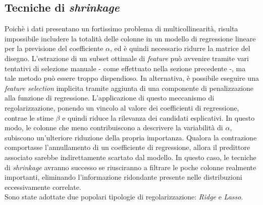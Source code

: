 \documentclass[fleqn,10pt]{SelfArx} %
\begin{document}
\subsection{Tecniche di \textit{shrinkage}}
Poichè i dati presentano un fortissimo problema di multicollinearità, risulta impossibile includere la totalità delle colonne in un modello di regressione lineare per la previsione del coefficiente $\alpha$, ed è quindi necessario ridurre la matrice del disegno. L'estrazione di un subset ottimale di \textit{feature} può avvenire tramite vari tentativi di selezione manuale - come effettuato nella sezione precedente -, ma tale metodo può essere troppo dispendioso. In alternativa, è possibile eseguire una \textit{feature selection} implicita tramite aggiunta di una componente di penalizzazione alla funzione di regressione. L'applicazione di questo meccanismo di regolarizzazione, ponendo un vincolo al valore dei coefficienti di regressione, contrae le stime $\beta$ e quindi riduce la rilevanza dei candidati esplicativi. In questo modo, le colonne che meno contribuiscono a descrivere la variabilità di $\alpha$, subiscono un'ulteriore riduzione della propria importanza. Qualora la contrazione comportasse l'annullamento di un coefficiente di regressione, allora il predittore associato sarebbe indirettamente scartato dal modello. In questo caso, le tecniche di \textit{shrinkage} avranno successo se riusciranno a filtrare le poche colonne realmente importanti, eliminando l'informazione ridondante presente nelle distribuzioni eccessivamente correlate.\\
Sono state adottate due popolari tipologie di regolarizzazione: \textit{Ridge} e \textit{Lasso}.
\end{document}
